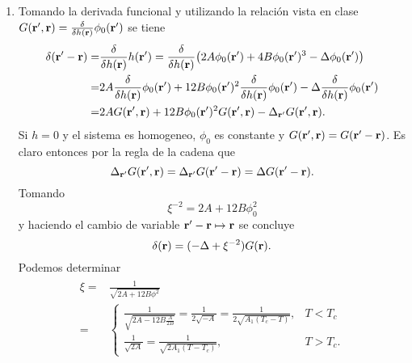 \documentclass{article}
\begin{document}
\begin{enumerate}

\item Tomando la derivada funcional y utilizando la relación vista en clase $G(\vb{r'},\vb{r})=\fdv{h(\vb{r})}\phi_0(\vb{r'})$ se tiene
\begin{align}
\begin{split}
\delta(\vb{r'}-\vb{r})=&\fdv{h(\vb{r})}h(\vb{r'})=\fdv{h(\vb{r})}\qty(2A\phi_0(\vb{r'})+4B\phi_0(\vb{r'})^3-\Delta\phi_0(\vb{r'}))\\
=&2A\fdv{h(\vb{r})}\phi_0(\vb{r'})+12B\phi_0(\vb{r'})^2\fdv{h(\vb{r})}\phi_0(\vb{r'})-\Delta\fdv{h(\vb{r})}\phi_0(\vb{r'})\\
=&2AG(\vb{r'},\vb{r})+12B\phi_0(\vb{r'})^2G(\vb{r'},\vb{r})-\Delta_{\vb{r'}} G(\vb{r'},\vb{r}).
\end{split}
\end{align}
Si $h=0$ y el sistema es homogeneo, $\phi_0$ es constante y $G(\vb{r'},\vb{r})=G(\vb{r'}-\vb{r})$. Es claro entonces por la regla de la cadena que
\begin{equation}
\Delta_{\vb{r'}} G(\vb{r'},\vb{r})=\Delta_{\vb{r'}} G(\vb{r'}-\vb{r})=\Delta G(\vb{r'}-\vb{r}).
\end{equation} 
Tomando
\begin{equation}
\xi^{-2}=2A+12B\phi_0^2
\end{equation}
y haciendo el cambio de variable $\vb{r'}-\vb{r}\mapsto\vb{r}$ se concluye
\begin{equation}\label{ec:funcion_green}
\delta(\vb{r})=(-\Delta+\xi^{-2})G(\vb{r}).
\end{equation}
Podemos determinar
\begin{align}
\begin{split}
\xi =& \frac{1}{\sqrt{2A+12B\phi^2}}\\
=&\begin{cases}
\frac{1}{\sqrt{2A-12B\frac{A}{2B}}}=\frac{1}{2\sqrt{-A}}=\frac{1}{2\sqrt{A_1(T_c-T)}}, & T<T_c\\
\frac{1}{\sqrt{2A}}=\frac{1}{\sqrt{2A_1(T-T_c)}}, & T>T_c.
\end{cases}
\end{split}
\end{align}


\end{enumerate}
\end{document}

